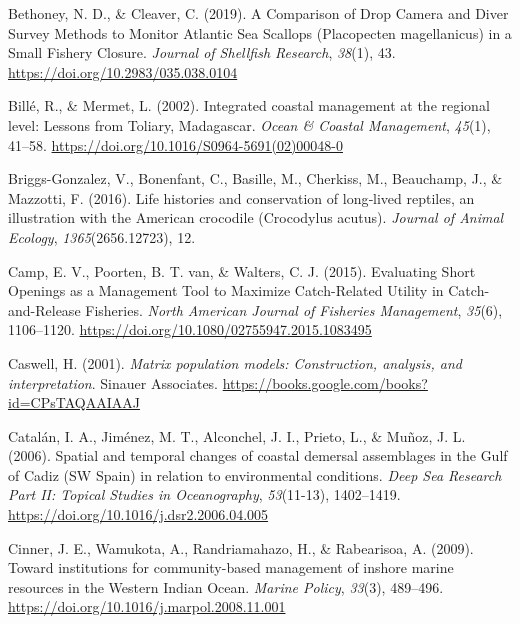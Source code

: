 \documentclass[
]{article}
\newlength{\cslhangindent}
\newlength{\cslentryspacingunit} %
\newenvironment{CSLReferences}[2] %
 {%
  \setlength{\parindent}{0pt}
  \ifodd #1
  \let\oldpar\par
  \def\par{\hangindent=\cslhangindent\oldpar}
  \fi
  \setlength{\parskip}{#2\cslentryspacingunit}
 }%
 {}
\begin{document}
\begin{CSLReferences}{1}{2}
\leavevmode{}%
Bethoney, N. D., \& Cleaver, C. (2019). A {Comparison} of {Drop} {Camera} and {Diver} {Survey} {Methods} to {Monitor} {Atlantic} {Sea} {Scallops} ({Placopecten} magellanicus) in a {Small} {Fishery} {Closure}. \emph{Journal of Shellfish Research}, \emph{38}(1), 43. \url{https://doi.org/10.2983/035.038.0104}

\leavevmode{}%
Billé, R., \& Mermet, L. (2002). Integrated coastal management at the regional level: Lessons from {Toliary}, {Madagascar}. \emph{Ocean \& Coastal Management}, \emph{45}(1), 41--58. \url{https://doi.org/10.1016/S0964-5691(02)00048-0}

\leavevmode{}%
Briggs-Gonzalez, V., Bonenfant, C., Basille, M., Cherkiss, M., Beauchamp, J., \& Mazzotti, F. (2016). Life histories and conservation of long‐lived reptiles, an illustration with the {American} crocodile ({Crocodylus} acutus). \emph{Journal of Animal Ecology}, \emph{1365}(2656.12723), 12.

\leavevmode{}%
Camp, E. V., Poorten, B. T. van, \& Walters, C. J. (2015). Evaluating {Short} {Openings} as a {Management} {Tool} to {Maximize} {Catch}-{Related} {Utility} in {Catch}-and-{Release} {Fisheries}. \emph{North American Journal of Fisheries Management}, \emph{35}(6), 1106--1120. \url{https://doi.org/10.1080/02755947.2015.1083495}

\leavevmode{}%
Caswell, H. (2001). \emph{Matrix population models: {Construction}, analysis, and interpretation}. Sinauer Associates. \url{https://books.google.com/books?id=CPsTAQAAIAAJ}

\leavevmode{}%
Catalán, I. A., Jiménez, M. T., Alconchel, J. I., Prieto, L., \& Muñoz, J. L. (2006). Spatial and temporal changes of coastal demersal assemblages in the {Gulf} of {Cadiz} ({SW} {Spain}) in relation to environmental conditions. \emph{Deep Sea Research Part II: Topical Studies in Oceanography}, \emph{53}(11-13), 1402--1419. \url{https://doi.org/10.1016/j.dsr2.2006.04.005}

\leavevmode{}%
Cinner, J. E., Wamukota, A., Randriamahazo, H., \& Rabearisoa, A. (2009). Toward institutions for community-based management of inshore marine resources in the {Western} {Indian} {Ocean}. \emph{Marine Policy}, \emph{33}(3), 489--496. \url{https://doi.org/10.1016/j.marpol.2008.11.001}


\end{CSLReferences}
\end{document}
